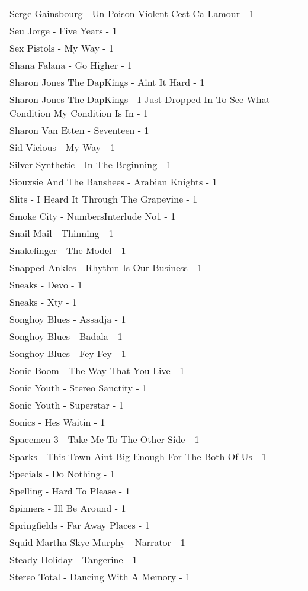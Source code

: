\documentclass[
]{article}
\begin{document}
\begin{longtable}{l}
Serge Gainsbourg - Un Poison Violent Cest Ca Lamour - 1 \\ 
Seu Jorge - Five Years - 1 \\ 
Sex Pistols - My Way - 1 \\ 
Shana Falana - Go Higher - 1 \\ 
Sharon Jones The DapKings - Aint It Hard - 1 \\ 
Sharon Jones The DapKings - I Just Dropped In To See What Condition My Condition Is In - 1 \\ 
Sharon Van Etten - Seventeen - 1 \\ 
Sid Vicious - My Way - 1 \\ 
Silver Synthetic - In The Beginning - 1 \\ 
Siouxsie And The Banshees - Arabian Knights - 1 \\ 
Slits - I Heard It Through The Grapevine - 1 \\ 
Smoke City - NumbersInterlude No1 - 1 \\ 
Snail Mail - Thinning - 1 \\ 
Snakefinger - The Model - 1 \\ 
Snapped Ankles - Rhythm Is Our Business - 1 \\ 
Sneaks - Devo - 1 \\ 
Sneaks - Xty - 1 \\ 
Songhoy Blues - Assadja - 1 \\ 
Songhoy Blues - Badala - 1 \\ 
Songhoy Blues - Fey Fey - 1 \\ 
Sonic Boom - The Way That You Live - 1 \\ 
Sonic Youth - Stereo Sanctity - 1 \\ 
Sonic Youth - Superstar - 1 \\ 
Sonics - Hes Waitin - 1 \\ 
Spacemen 3 - Take Me To The Other Side - 1 \\ 
Sparks - This Town Aint Big Enough For The Both Of Us - 1 \\ 
Specials - Do Nothing - 1 \\ 
Spelling - Hard To Please - 1 \\ 
Spinners - Ill Be Around - 1 \\ 
Springfields - Far Away Places - 1 \\ 
Squid Martha Skye Murphy - Narrator - 1 \\ 
Steady Holiday - Tangerine - 1 \\ 
Stereo Total - Dancing With A Memory - 1 \\ 

\end{longtable}
\end{document}
